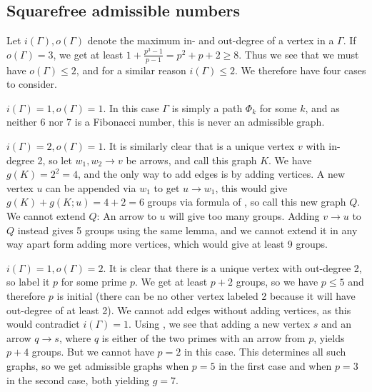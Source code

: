 \documentclass[draft]{article}
\theoremstyle{plain}
\theoremstyle{definition}
\begin{document}
\subsection{Squarefree admissible numbers}
Let $i(\Gamma), o(\Gamma)$ denote the maximum in- and out-degree of a vertex in a \hg $\Gamma$. If $o(\Gamma) = 3$, we get at least $1 + \frac{p^3 - 1}{p - 1} = p^2 + p + 2 \ge 8$. Thus we see that we must have $o(\Gamma) \le 2$, and for a similar reason $i(\Gamma) \le 2$. We therefore have four cases to consider.

 $i(\Gamma) = 1, o(\Gamma) = 1$. In this case $\Gamma$ is simply a path $\Phi_k$ for some $k$, and as neither 6 nor 7 is a Fibonacci number, this is never an admissible graph.

 $i(\Gamma) = 2, o(\Gamma) = 1$. It is similarly clear that is a unique vertex $v$ with in-degree 2, so let $w_1, w_2 \rightarrow v$ be arrows, and call this graph $K$. We have $g(K) = 2^2 = 4$, and the only way to add edges is by adding vertices. A new vertex $u$ can be appended via $w_1$ to get $u \rightarrow w_1$, this would give $g(K) + g(K; u) = 4 + 2 = 6$ groups via formula  of , so call this new graph $Q$. We cannot extend $Q$: An arrow to $u$ will give too many groups. Adding $v \rightarrow u$ to $Q$ instead gives 5 groups using the same lemma, and we cannot extend it in any way apart form adding more vertices, which would give at least 9 groups.

 $i(\Gamma) = 1, o(\Gamma) = 2$. It is clear that there is a unique vertex with out-degree 2, so label it $p$ for some prime $p$. We get at least $p + 2$ groups, so we have $p \le 5$ and therefore $p$ is initial (there can be no other vertex labeled 2 because it will have out-degree of at least 2). We cannot add edges without adding vertices, as this would contradict $i(\Gamma) = 1$. Using , we see that adding a new vertex $s$ and an arrow $q \rightarrow s$, where $q$ is either of the two primes with an arrow from $p$, yields $p + 4$ groups. But we cannot have $p = 2$ in this case. This determines all such graphs, so we get admissible graphs when $p = 5$ in the first case and when $p = 3$ in the second case, both yielding $g = 7$.
\end{document}
